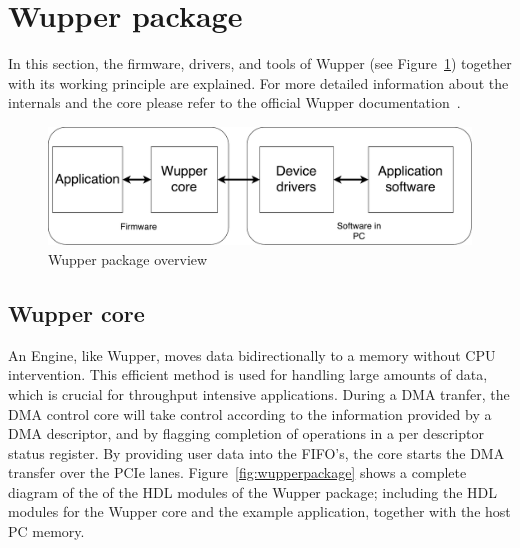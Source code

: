 \newpage
\section{Wupper package}

In this section, the firmware, drivers, and tools of Wupper (see Figure~\ref{fig:simplewupperpackage}) together with its working principle are explained. For more detailed information about the internals and the core please refer to the official Wupper documentation~\cite{wupperoffical}.

\begin{figure}[h]
	\centering
	\includegraphics[width = .8 \textwidth]{figures/wupper_package_simple.pdf}	
	\caption{Wupper package overview}
	\label{fig:simplewupperpackage}
\end{figure}

\subsection {Wupper core}


An Engine, like Wupper, moves data bidirectionally to a memory without CPU intervention. This efficient method is used for handling large amounts of data, which is crucial for throughput intensive applications. During a DMA tranfer, the DMA control core will take control according to the information provided by a DMA descriptor, and by flagging completion of operations in a per descriptor status register. By providing user data into the FIFO's, the core starts the DMA transfer over the PCIe lanes. Figure~\ref{fig:wupperpackage} shows a complete diagram of the of the HDL modules of the Wupper package; including the HDL modules for the Wupper core and the example application, together with the host PC memory.

